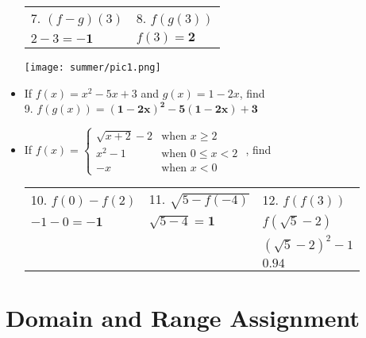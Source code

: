 \documentclass[a4paper]{article}
\begin{document}
\begin{itemize}
      \begin{tabular}{ p{6cm} p{6cm} }
         7. $ (f-g)(3)     $&
         8. $ f(g(3))      $
      \\
         $ 2-3 = \bm{-1}   $&
         $ f(3) = \bm{2}   $
      \end{tabular}

    \texttt{[image: summer/pic1.png]}
\\

   \item
      If $ f(x) = x^2 - 5x + 3 $ and $ g(x)=1-2x $, find \\

      9. $ f(g(x)) = \bm{ (1-2x)^2 - 5(1-2x) + 3 } $
   
   \item
      If $
      f(x) =
      \begin{cases}
         \sqrt{x+2}-2 & \text{when } x \geq 2 \\
         x^2-1        & \text{when } 0 \leq x < 2 \\
         -x           & \text{when } x < 0
      \end{cases} $
      , find

      \begin{tabular}{ p{5cm} p{5cm} p{5cm} }
         10. $ f(0) - f(2)          $&
         11. $ \sqrt{ 5 - f(-4) }   $&
         12. $ f(f(3))              $
      \\
         $ -1 - 0 = \bm{-1}         $&
         $ \sqrt{ 5-4 } = \bm{1}    $&
         $ f( \sqrt{5} - 2 )        $
      \\
         & %
         & %
         $ ( \sqrt{5} - 2 )^2 - 1   $
      \\
         & %
         & %
         $ \bm{0.94}                $
      \end{tabular}

   \end{itemize}

   \section{Domain and Range Assignment}
   
\end{document}
